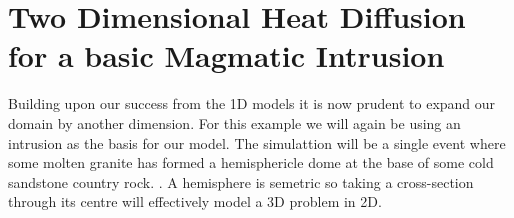 
%
%
%

\section{Two Dimensional Heat Diffusion for a basic Magmatic Intrusion}
 Building upon our success from the 1D models it is now prudent to expand our domain by another dimension. For this example we will again be using an intrusion as the basis for our model. The simulattion will be a single event where some molten granite has formed a hemisphericle dome at the base of some cold sandstone country rock.  . A hemisphere is semetric so taking a cross-section through its centre will effectively model a 3D problem in 2D.

